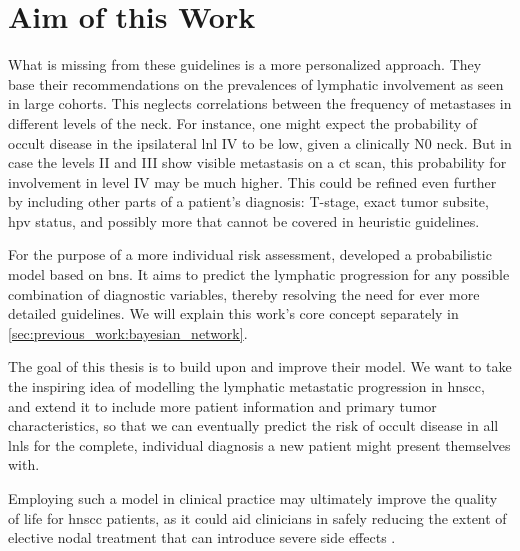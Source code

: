 \documentclass[\relativeRoot/main.tex]{subfiles}
\begin{document}
\section{Aim of this Work}
\label{sec:intro:aim}

What is missing from these guidelines is a more personalized approach. They base their recommendations on the prevalences of lymphatic involvement as seen in large cohorts. This neglects correlations between the frequency of metastases in different levels of the neck. For instance, one might expect the probability of occult disease in the ipsilateral \gls{lnl} IV to be low, given a clinically N0 neck. But in case the levels II and III show visible metastasis on a \gls{ct} scan, this probability for involvement in level IV may be much higher. This could be refined even further by including other parts of a patient's diagnosis: T-stage, exact tumor subsite, \gls{hpv} status, and possibly more that cannot be covered in heuristic guidelines.

For the purpose of a more individual risk assessment,  developed a probabilistic model based on \glspl{bn}. It aims to predict the lymphatic progression for any possible combination of diagnostic variables, thereby resolving the need for ever more detailed guidelines. We will explain this work's core concept separately in \cref{sec:previous_work:bayesian_network}.

The goal of this thesis is to build upon and improve their model. We want to take the inspiring idea of modelling the lymphatic metastatic progression in \gls{hnscc}, and extend it to include more patient information and primary tumor characteristics, so that we can eventually predict the risk of occult disease in all \glspl{lnl} for the complete, individual diagnosis a new patient might present themselves with.

Employing such a model in clinical practice may ultimately improve the quality of life for \gls{hnscc} patients, as it could aid clinicians in safely reducing the extent of elective nodal treatment that can introduce severe side effects \cite{batth_practical_2014}.
\end{document}
